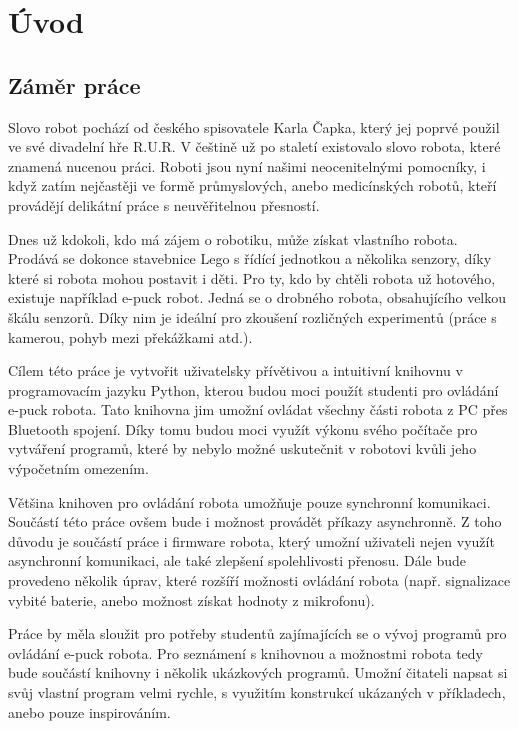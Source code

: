 \documentclass[12pt,notitlepage]{report}
\begin{document}
\newpage

\chapter{Úvod} %

    \section{Záměr práce}

    Slovo robot pochází od českého spisovatele Karla Čapka, který jej poprvé
    použil ve své divadelní hře R.U.R. V češtině už po staletí existovalo slovo
    robota, které znamená nucenou práci. Roboti jsou nyní našimi neocenitelnými
    pomocníky, i když zatím nejčastěji ve formě průmyslových, anebo
    medicínských robotů, kteří provádějí delikátní práce s neuvěřitelnou
    přesností.

    Dnes už kdokoli, kdo má zájem o robotiku, může získat vlastního robota.
    Prodává se dokonce stavebnice Lego s řídící jednotkou a několika senzory,
    díky které si robota mohou postavit i děti. Pro ty, kdo by chtěli robota už
    hotového, existuje například e-puck robot. Jedná se o drobného robota,
    obsahujícího velkou škálu senzorů. Díky nim je ideální pro zkoušení
    rozličných experimentů (práce s kamerou, pohyb mezi překážkami atd.).

    Cílem této práce je vytvořit uživatelsky přívětivou a intuitivní knihovnu v
    programovacím jazyku Python, kterou budou moci použít studenti pro ovládání
    e-puck robota. Tato knihovna jim umožní ovládat všechny části robota z PC
    přes Bluetooth spojení. Díky tomu budou moci využít výkonu svého počítače
    pro vytváření programů, které by nebylo možné uskutečnit v robotovi kvůli
    jeho výpočetním omezením.

    Většina knihoven pro ovládání robota umožňuje pouze synchronní komunikaci.
    Součástí této práce ovšem bude i možnost provádět příkazy asynchronně. Z
    toho důvodu je součástí práce i firmware robota, který umožní uživateli
    nejen využít asynchronní komunikaci, ale také zlepšení spolehlivosti
    přenosu. Dále bude provedeno několik úprav, které rozšíří možnosti ovládání
    robota (např. signalizace vybité baterie, anebo možnost získat hodnoty z
    mikrofonu).

    Práce by měla sloužit pro potřeby studentů zajímajících se o vývoj
    programů pro ovládání e-puck robota. Pro seznámení s knihovnou a možnostmi
    robota tedy bude součástí knihovny i několik ukázkových programů. Umožní
    čitateli napsat si svůj vlastní program velmi rychle, s využitím konstrukcí
    ukázaných v příkladech, anebo pouze inspirováním.
\end{document}
